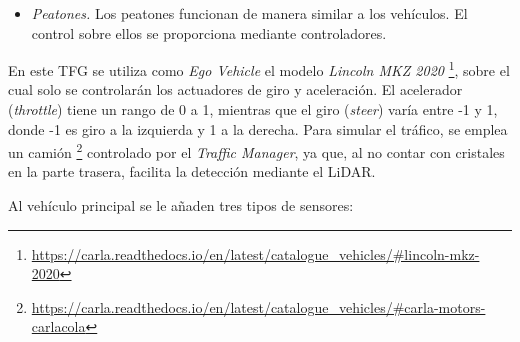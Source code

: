 \begin{itemize}
\begin{code}[h]
\begin{lstlisting}[language=python]
	vehicle_vp = world.get_blueprint_library().find(vehicle_type)
	vehicle_vp.set_attribute('role_name', 'hero') # Ego vehicle
	ego_vehicle = world.spawn_actor(vehicle_bp, transform)
	ego_vehicle.apply_control(carla.VehicleControl(throttle=0.5, steer=0.1, brake=0.01))

	\end{lstlisting}
	\caption[Configuración de \textit{Ego Vehicle} en CARLA]{Configuración de \textit{Ego Vehicle} en CARLA.}
	\label{cod:ego_carla}
	\end{code}
    \item \textit{Peatones.} Los peatones funcionan de manera similar a los vehículos. El control sobre ellos se proporciona mediante controladores.
\end{itemize}

En este \ac{TFG} se utiliza como \textit{Ego Vehicle} el modelo \textit{Lincoln MKZ 2020} \footnote{\url{https://carla.readthedocs.io/en/latest/catalogue_vehicles/\#lincoln-mkz-2020}}, sobre el cual solo se controlarán los actuadores de giro y aceleración. El acelerador (\textit{throttle}) tiene un rango de 0 a 1, mientras que el giro (\textit{steer}) varía entre -1 y 1, donde -1 es giro a la izquierda y 1 a la derecha. Para simular el tráfico, se emplea un camión \footnote{\url{https://carla.readthedocs.io/en/latest/catalogue_vehicles/\#carla-motors-carlacola}} controlado por el \textit{Traffic Manager}, ya que, al no contar con cristales en la parte trasera, facilita la detección mediante el \ac{LiDAR}.

Al vehículo principal se le añaden tres tipos de sensores:

